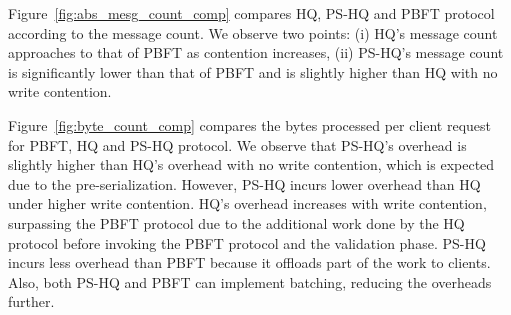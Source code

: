 \documentclass[twocolumn,10pt]{article}
\newcommand{\stitle}[1]{\vspace{2pt}{\bf #1:}}
\begin{document}
Figure~\ref{fig:abs_mesg_count_comp} compares HQ, PS-HQ and PBFT protocol according to the message
count. We observe two points: (i) HQ's message count approaches to that of PBFT as contention
increases, (ii) PS-HQ's message count is significantly lower than that of PBFT and is slightly
higher than HQ with no write contention.



\stitle{Byte load}
Figure~\ref{fig:byte_count_comp} compares the
bytes processed per client request for PBFT, HQ and PS-HQ protocol. We observe that
PS-HQ's overhead is slightly higher than HQ's overhead with no write contention, which is expected due
to the pre-serialization. However, PS-HQ incurs lower overhead than HQ under higher write contention.
HQ's overhead increases with write contention, surpassing the PBFT
protocol due to the additional work done by the HQ protocol before invoking the PBFT protocol and
the validation phase. PS-HQ incurs less overhead than PBFT because it offloads part of the work to
clients. Also, both PS-HQ and PBFT can implement batching, reducing the overheads further.
\end{document}
